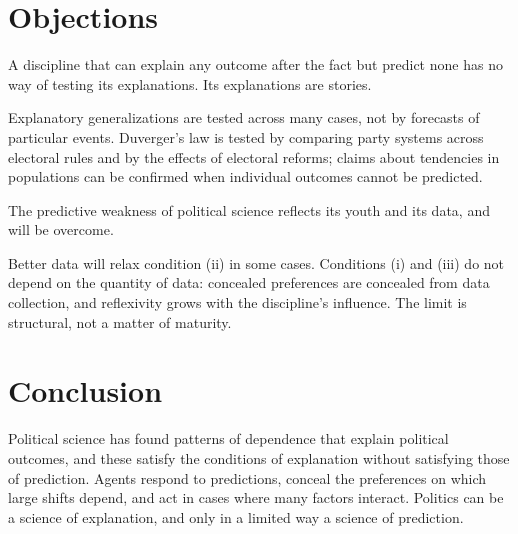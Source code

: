 \documentclass{situationist-preprint}
\begin{document}
\section{Objections}

\begin{objection}
A discipline that can explain any outcome after the fact but predict none has no way of testing its explanations. Its explanations are stories.
\end{objection}

\begin{reply}
Explanatory generalizations are tested across many cases, not by forecasts of particular events. Duverger's law is tested by comparing party systems across electoral rules and by the effects of electoral reforms; claims about tendencies in populations can be confirmed when individual outcomes cannot be predicted.
\end{reply}

\begin{objection}
The predictive weakness of political science reflects its youth and its data, and will be overcome.
\end{objection}

\begin{reply}
Better data will relax condition (ii) in some cases. Conditions (i) and (iii) do not depend on the quantity of data: concealed preferences are concealed from data collection, and reflexivity grows with the discipline's influence. The limit is structural, not a matter of maturity.
\end{reply}

\section{Conclusion}

Political science has found patterns of dependence that explain political outcomes, and these satisfy the conditions of explanation without satisfying those of prediction. Agents respond to predictions, conceal the preferences on which large shifts depend, and act in cases where many factors interact. Politics can be a science of explanation, and only in a limited way a science of prediction.
\end{document}
